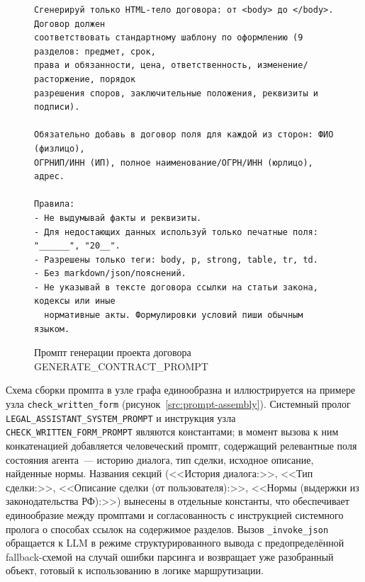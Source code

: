 \begin{figure}[H]
\begin{lstlisting}[style=promptstyle]
Сгенерируй только HTML-тело договора: от <body> до </body>. Договор должен
соответствовать стандартному шаблону по оформлению (9 разделов: предмет, срок,
права и обязанности, цена, ответственность, изменение/расторжение, порядок
разрешения споров, заключительные положения, реквизиты и подписи).

Обязательно добавь в договор поля для каждой из сторон: ФИО (физлицо),
ОГРНИП/ИНН (ИП), полное наименование/ОГРН/ИНН (юрлицо), адрес.

Правила:
- Не выдумывай факты и реквизиты.
- Для недостающих данных используй только печатные поля: "______", "20__".
- Разрешены только теги: body, p, strong, table, tr, td.
- Без markdown/json/пояснений.
- Не указывай в тексте договора ссылки на статьи закона, кодексы или иные
  нормативные акты. Формулировки условий пиши обычным языком.
\end{lstlisting}
\caption{Промпт генерации проекта договора GENERATE\_CONTRACT\_PROMPT}
\label{src:prompt-generate}
\end{figure}

Схема сборки промпта в узле графа единообразна и иллюстрируется на примере узла \texttt{check\_written\_form} (рисунок~\ref{src:prompt-assembly}). Системный пролог \texttt{LEGAL\_ASSISTANT\_SYSTEM\_PROMPT} и инструкция узла \texttt{CHECK\_WRITTEN\_FORM\_PROMPT} являются константами; в момент вызова к ним конкатенацией добавляется человеческий промпт, содержащий релевантные поля состояния агента~--- историю диалога, тип сделки, исходное описание, найденные нормы. Названия секций (<<История диалога:>>, <<Тип сделки:>>, <<Описание сделки (от пользователя):>>, <<Нормы (выдержки из законодательства РФ):>>) вынесены в отдельные константы, что обеспечивает единообразие между промптами и согласованность с инструкцией системного пролога о способах ссылок на содержимое разделов. Вызов \texttt{\_invoke\_json} обращается к LLM в режиме структурированного вывода с предопределённой fallback-схемой на случай ошибки парсинга и возвращает уже разобранный объект, готовый к использованию в логике маршрутизации.

